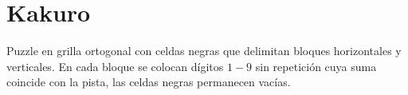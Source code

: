 

\section{Kakuro}\label{sec:02-kakuro}
Puzzle en grilla ortogonal con celdas negras que delimitan bloques horizontales y verticales. En cada bloque se colocan dígitos \(1\!-\!9\) sin repetición cuya suma coincide con la pista, las celdas negras permanecen vacías.
